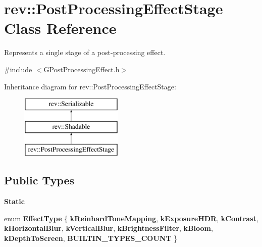 \hypertarget{classrev_1_1_post_processing_effect_stage}{}\section{rev\+::Post\+Processing\+Effect\+Stage Class Reference}
\label{classrev_1_1_post_processing_effect_stage}


Represents a single stage of a post-\/processing effect.  




{\ttfamily \#include $<$G\+Post\+Processing\+Effect.\+h$>$}

Inheritance diagram for rev\+::Post\+Processing\+Effect\+Stage\+:\begin{figure}[H]
\begin{center}
\leavevmode
\includegraphics[height=3.000000cm]{classrev_1_1_post_processing_effect_stage}
\end{center}
\end{figure}
\subsection*{Public Types}
\begin{Indent}\textbf{ Static}\par
\begin{DoxyCompactItemize}
\item 
\mbox{\label{classrev_1_1_post_processing_effect_stage_a3010fcfb68f513599f67f75f361e6116}} 
enum {\bfseries Effect\+Type} \{ \newline
{\bfseries k\+Reinhard\+Tone\+Mapping}, 
{\bfseries k\+Exposure\+H\+DR}, 
{\bfseries k\+Contrast}, 
{\bfseries k\+Horizontal\+Blur}, 
\newline
{\bfseries k\+Vertical\+Blur}, 
{\bfseries k\+Brightness\+Filter}, 
{\bfseries k\+Bloom}, 
{\bfseries k\+Depth\+To\+Screen}, 
\newline
{\bfseries B\+U\+I\+L\+T\+I\+N\+\_\+\+T\+Y\+P\+E\+S\+\_\+\+C\+O\+U\+NT}
 \}
\end{DoxyCompactItemize}
\end{Indent}
